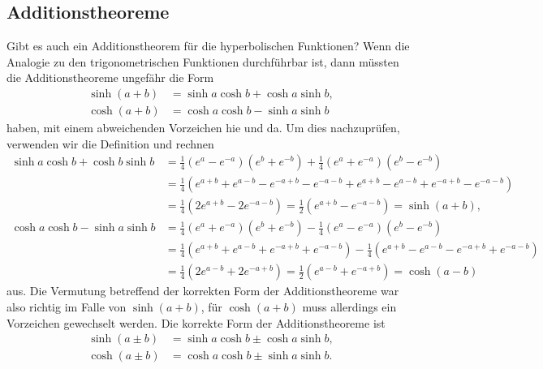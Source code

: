 \documentclass[a4paper,12pt]{article}
\begin{document}
\subsection{Additionstheoreme}
Gibt es auch ein Additionstheorem für die hyperbolischen Funktionen?
Wenn die Analogie zu den trigonometrischen Funktionen durchführbar ist,
dann müssten die Additionstheoreme ungefähr die Form
\begin{align*}
\sinh(a+b)&=\sinh a\cosh b + \cosh a\sinh b,\\
\cosh(a+b)&=\cosh a\cosh b - \sinh a\sinh b
\end{align*}
haben, mit einem abweichenden Vorzeichen hie und da.
Um dies nachzuprüfen, verwenden wir die Definition und rechnen
\begin{align*}
\sinh a\cosh b + \cosh b\sinh b
&=
\frac14(e^a-e^{-a})(e^b+e^{-b})
+
\frac14(e^a+e^{-a})(e^b-e^{-b})
\\
&=\frac14(e^{a+b}+e^{a-b}-e^{-a+b}-e^{-a-b} + e^{a+b}-e^{a-b}+e^{-a+b}-e^{-a-b})
\\
&=
\frac14(2e^{a+b}-2e^{-a-b})
=
\frac12(e^{a+b}-e^{-a-b})=\sinh(a+b),
\\
\cosh a\cosh b-\sinh a\sinh b
&=
\frac14(e^a+e^{-a})(e^b+e^{-b})
-
\frac14(e^a-e^{-a})(e^b-e^{-b})
\\
&=
\frac14(e^{a+b}+e^{a-b}+e^{-a+b}+e^{-a-b})
-
\frac14(e^{a+b}-e^{a-b}-e^{-a+b}+e^{-a-b})
\\
&=
\frac14(2e^{a-b}+2e^{-a+b})
=
\frac12(e^{a-b}+e^{-a+b})=\cosh(a-b)
\end{align*}
aus.
Die Vermutung betreffend der korrekten Form der Additionstheoreme
war also richtig im Falle von $\sinh(a+b)$, für $\cosh(a+b)$ muss
allerdings ein Vorzeichen gewechselt werden.
Die korrekte Form der Additionstheoreme ist
\begin{align*}
\sinh(a\pm b)&=\sinh a\cosh b \pm \cosh a\sinh b,\\
\cosh(a\pm b)&=\cosh a\cosh b \pm \sinh a\sinh b.
\end{align*}
\end{document}
